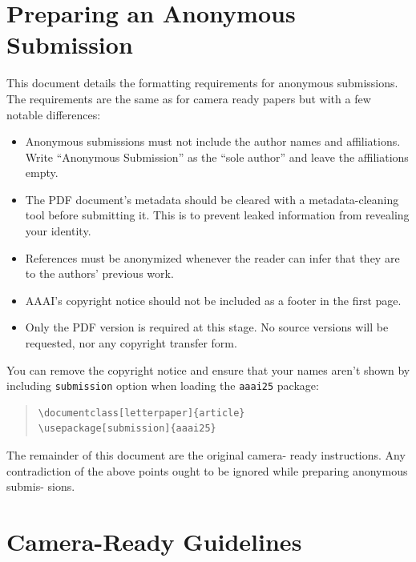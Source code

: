 \documentclass[letterpaper]{article} %
\begin{document}

\section{Preparing an Anonymous Submission}

This document details the formatting requirements for anonymous submissions. The requirements are the same as for camera ready papers but with a few notable differences:

\begin{itemize}
    \item Anonymous submissions must not include the author names and affiliations. Write ``Anonymous Submission'' as the ``sole author'' and leave the affiliations empty.
    \item The PDF document's metadata should be cleared with a metadata-cleaning tool before submitting it. This is to prevent leaked information from revealing your identity.
    \item References must be anonymized whenever the reader can infer that they are to the authors' previous work.
    \item AAAI's copyright notice should not be included as a footer in the first page.
    \item Only the PDF version is required at this stage. No source versions will be requested, nor any copyright transfer form.
\end{itemize}

You can remove the copyright notice and ensure that your names aren't shown by including \texttt{submission} option when loading the \texttt{aaai25} package:

\begin{quote}\begin{scriptsize}\begin{verbatim}
\documentclass[letterpaper]{article}
\usepackage[submission]{aaai25}
\end{verbatim}\end{scriptsize}\end{quote}

The remainder of this document are the original camera-
ready instructions. Any contradiction of the above points
ought to be ignored while preparing anonymous submis-
sions.

\section{Camera-Ready Guidelines}
\end{document}
